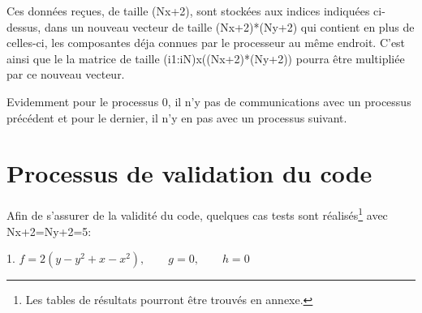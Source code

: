 \documentclass[a4paper,12pt,twoside]{report}
\begin{document}
	


Ces données reçues, de taille (Nx+2), sont stockées aux indices indiquées  ci-dessus, dans un nouveau vecteur de taille (Nx+2)*(Ny+2) qui contient en plus de celles-ci, les composantes déja connues par le processeur au même endroit. C'est ainsi que le la matrice de taille (i1:iN)x((Nx+2)*(Ny+2)) pourra être multipliée par ce nouveau vecteur.


Evidemment pour le processus 0, il n'y pas de communications avec un processus précédent et pour le dernier, il n'y en pas avec un processus suivant.



\chapter{Processus de validation du code}
Afin de s'assurer de la validité du code, quelques cas tests sont réalisés\footnote{Les tables de résultats pourront être trouvés en annexe.} avec Nx+2=Ny+2=5:


1. $f = 2(y-y^2+x-x^2),  \quad \quad         g=0,          \quad    \quad     h=0$




\begin{figure}[h]
\begin{minipage}[c]{.46\linewidth}

   \end{minipage}
   \hskip 50pt
   \begin{minipage}[c]{.46\linewidth}
   \end{minipage}

\end{figure}
\end{document}
